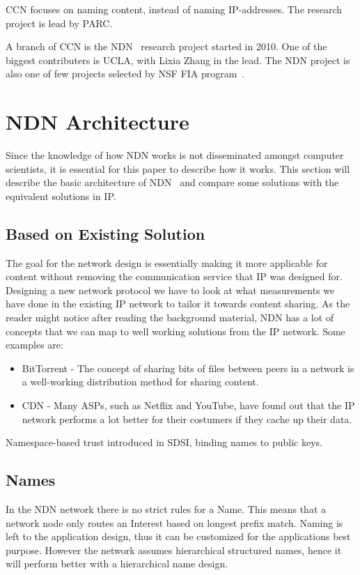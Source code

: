 \gls{CCN} focuses on naming content, instead of naming \gls{IP}-addresses. 
The research project is lead by \gls{PARC}.

A branch of \gls{CCN} is the \gls{NDN}~\cite{DBLP:journals/ccr/0001ABJcCPWZ14} research project started in 2010.
One of the biggest contributers is \gls{UCLA}, with Lixia Zhang in the lead. 
The \gls{NDN} project is also one of few projects selected by \gls{NSF} \gls{FIA} program~\cite{nsf-fia}.

\section{NDN Architecture}\label{chp2:sec:ndn_architecture}
Since the knowledge of how \gls{NDN} works is not disseminated amongst computer scientists, it is essential for this paper to describe how it works.
This section will describe the basic architecture of \gls{NDN}~\cite{NDN-0021} and compare some solutions with the equivalent solutions in \gls{IP}.

\subsection{Based on Existing Solution}
The goal for the network design is essentially making it more applicable for content without removing the communication service that \gls{IP} was designed for. 
Designing a new network protocol we have to look at what measurements we have done in the existing \gls{IP} network to tailor it towards content sharing.
As the reader might notice after reading the background material, \gls{NDN} has a lot of concepts that we can map to well working solutions from the \gls{IP} network.
Some examples are:
\begin{itemize}
  \item BitTorrent - 
  The concept of sharing bits of files between peers in a network is a well-working distribution method for sharing content.
  \item \gls{CDN} - 
  Many \gls{ASP}s, such as Netflix and YouTube, have found out that the \gls{IP} network performs a lot better for their costumers if they cache up their data.
\end{itemize}

Namespace-based trust introduced in \gls{SDSI}, binding names to public keys.

\subsection{Names}\label{name}
In the \gls{NDN} network there is no strict rules for a Name.
This means that a network node only routes an Interest based on longest prefix match.
Naming is left to the application design, thus it can be customized for the applications best purpose.
However the network assumes hierarchical structured names, hence it will perform better with a hierarchical name design.

